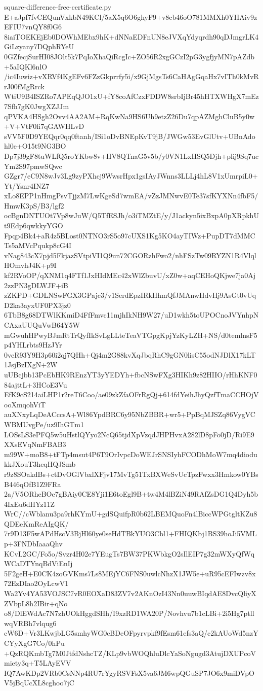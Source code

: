 \documentclass[11pt]{article}
\theoremstyle{definition}
\theoremstyle{remark}
\begin{document}
\begin{filecontents*}[overwrite]{square-difference-free-certificate.py}
E+aJpf7fvCEQunVxkbN49KCl/5aX5q6O6ghyF9+v8cb46oO781MMXh0YHAiv9zEFIU7vnQY8f0G6
8iaiTOEKEjEb0DOWhMEbx9hK+dNNaEDFnUN8eJVXqYdyqrdh90qDJmgrLK4GiLzyany7DQphRYeU
0GZfecjSurHI08JOlt5k7PqIoXhaQiRcgIc+ZO56R2xgGCzI2pG3ygfjyMN7pAZdb+5aIQKl6nlO
/ic4Iuwiz+vXRVf4KgEFv6FZzGkprrfy5i/x9GjMgsTs6CaHAgGqaHx7vITh0kMvRrJ00fMgRrck
WtiU9B4ISZRo7APEqQJO1xU+fY8coAfCzxFDDW8srbIjBr45hHTXWHgX7mEz7Sfh7gK0JwgXZJJm
qPVKA4HSgh2Ovv4AA2AM+RqKwNa9HS6Uh9etzZ26Du7qpAZMghCluB5y0w+V+VtF0fi7qGAWHLvD
sVV5F0D9YEQqr0qq0ftanh/ISi1oDvBNEpKvT9jB/JWGw53EvGlUtv+UBnAdohl0e+O15t9NG3BO
Dp7j39gF8tuWLfQ5roYKbw8v+HV8QTnaG5v5b/y0VN1LxHSQ5Djh+plij9Sq7ucYm2S97pmwSQwc
GZgr7/eC9N8wJv3Lg9zyPXhcj9WwsrHpx1gsIAyJWnns3LLLj4hL8V1xUmrpiL0+Yt/Ysnr4INZ7
xLo8EPP1nHmgPsvTjjzM7LwKgeSd7wmEA/vZzJMNwvE0Te37sfKYXNn4fbF5/HmwK3pS/B3/lgf2
ocBgnDNTUOt7Vp8wJuW/Q5TfESJh/o3iTMZtE/y/J1ackyn5ixBxpA0pXRpkhUt9Edp6qwkkyYGO
Fpqp4Bk4+aR4z5BLost0NTNO3rS5o97cUXS1Kg5KO4ayTIWz+PupDT7dMMCTs5aMVcPqukp8cG4I
vNag843cX7pjd5FkjazSVtpiVI1Q9un72CGORzhFwo2/nhFSzTw09RYZN1R4VlqlHOmvhJ4K+p9I
kf2RVoOP/qXNM1q4FTf1JxHIdMEc42xWlZbuvU/xZ0w+aqCEHoQKjwe7ja0Aj2zzPN3gDLWJF+iB
zZKPD+GDLNSwFGX3GPajc3/v1SerdEpzIRkHhmQfJMAnwHdvHj9AsGt0vUqD2ka3ayxUF0PX3jz0
6TbB8g68DTWlKKmiD4FfFmvc11mjhIkNH9W27/uD1wkh5toUPOCnoJVYnhpNCAxaUUQuVwB64Y5W
mGwuhHPwyBJmRtTrQyfIkSvLgLLteTeaVTGpgKpjYzKyLZH+NS/d0temlnsF5p4YHLrbts9HzJYr
0veR93Y9H3p60i2qj7QHh+Qj4m2G88kvXqJbqRhC9gGN0lisC55odNJDlX17kLT1JsjBzIXgN+2W
uUBcjbb13PcEbHK9REnzYT3yYEDYh+fbcNSwFXg3HIKh9z82HIIO/rHhKNF084ajttL+3HCoE3Vu
EfK9cS214aiLHP1r2reT6Coo/ae09zkZfaOFrRgQj+614fdYeihJhyQzfTmaCCHOjVooXmqohViT
auXNxyLqDeACccsA+Wl86YpdBRC6y95NbZBBR+wr5+PpBqMJSZq86VygVCWBMUvgPe/uz9IhGTm1
LOSsLS3ePFQ5w5uHstlQYyo2NcQ65tjdXpVzqdJHPHvxA282lD8pFo0jD/Ri9E9XXsEVqNmFBAB3
m99W+moB8+tFTp4msut4P6T9OrIvpcDoWEJrSNSIyhFCODhMoW7mq4diodukkJXouT3heqHQJSmb
r9z8SOakdBs+ctDvOGlVbxlXFjv17MvTg51TxBXWeSvUcTpzFwxx3Hmkow0YBsB446qOfB1Z9FRa
2a/V5ORheBOe7gBAiy0CE8Yji1E6toEgl9B+tw4M4lBZiN49RAfZsDG1Q4Dyh5b4IxEu6dHYz11Z
WrC//cWblanu3pa9rhKYmU+gdSQuifpR0b62LBEMQuoFn4lBiccWPGtgltKZu8QDEeKmReAIgQK/
7r9D13F5wAPdHscV3BjHl60ye0seHdTBkYUO3Cbl1+FHIQKbj1BS39hoJi5VMLp+3FNDbIaaaQhv
KCvL2GC/Fo5o/Svzr4H02e7YEugTs7BW37PKWbkgO2sIlEIP7g32mWXyQfWqWCaDTYnqBdViEnIj
5F2geH+E0CK4zoGVKms7Ls8MEjYC6FNS0uwlcNhzX1JW5e+uR95cEFIwzv8x72EzDIao2OyLcwV1
Wa2Yv4YA53VOJSC7vR0EOXaD83ZV7v2AKnOzI43Nn0uuwBIqdAE8DvcQliyXZVbpL8h2IBir+qNo
o8/DlEWdAc7N7zhUOkHggdSHh/I9xzRD1WA20P/Novhvu7b1cLBi+2i5Hg7ptllwqVRBh7vlqug6
cW6D+Vr3LKwjbLG5smhyWG0cBDeOFpyrvpkf9fEsm61efs3aQ/c2kAUoWd5nzYCYyXgG7Co/0hPu
+QzRQKmbTg7M0JtfdNshcTZ/KLp9vbWOQhluDlcYaSoNgugd3AtujDXUPcoVmiety3q+T5LAyEVV
IQ7AwKDp2VRb0CsNNp4RU7rYgyRSVFsX5va6JM6wpQGuSP7JO6x9miDVpOV5jBqUcXL8cghoo7jC

\end{filecontents*}
\end{document}
